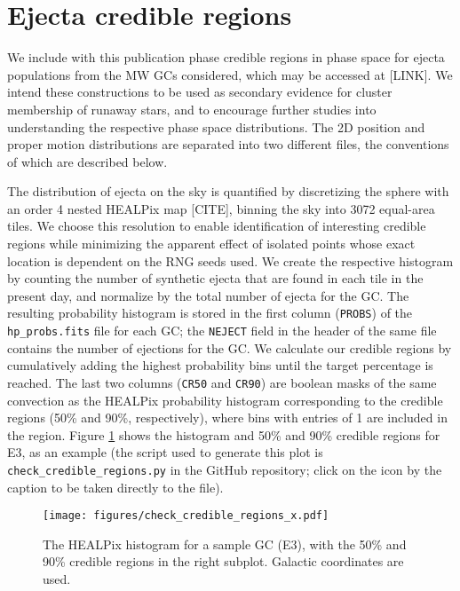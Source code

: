 \documentclass[twocolumn]{aastex631}
\begin{document}
\appendix

\section{Ejecta credible regions} \label{app:credreg}

We include with this publication phase credible regions in phase space for ejecta populations from the MW GCs considered, which may be accessed at [LINK].
We intend these constructions to be used as secondary evidence for cluster membership of runaway stars, and to encourage further studies into understanding the respective phase space distributions.
The 2D position and proper motion distributions are separated into two different files, the conventions of which are described below.

The distribution of ejecta on the sky is quantified by discretizing the sphere with an order 4 nested HEALPix map [CITE], binning the sky into 3072 equal-area tiles.
We choose this resolution to enable identification of interesting credible regions while minimizing the apparent effect of isolated points whose exact location is dependent on the RNG seeds used.
We create the respective histogram by counting the number of synthetic ejecta that are found in each tile in the present day, and normalize by the total number of ejecta for the GC.
The resulting probability histogram is stored in the first column (\texttt{PROBS}) of the \texttt{hp\_probs.fits} file for each GC; the \texttt{NEJECT} field in the header of the same file contains the number of ejections for the GC.
We calculate our credible regions by cumulatively adding the highest probability bins until the target percentage is reached.
The last two columns (\texttt{CR50} and \texttt{CR90}) are boolean masks of the same convection as the HEALPix probability histogram corresponding to the credible regions (50\% and 90\%, respectively), where bins with entries of 1 are included in the region.
Figure \ref{fig:check_credible_regions_x} shows the histogram and 50\% and 90\% credible regions for E3, as an example (the script used to generate this plot is \texttt{check\_credible\_regions.py} in the GitHub repository; click on the icon by the caption to be taken directly to the file).

\begin{figure}
    \centering
    \texttt{[image: figures/check\_credible\_regions\_x.pdf]}
    \caption{
        The HEALPix histogram for a sample GC (E3), with the 50\% and 90\% credible regions in the right subplot.
        Galactic coordinates are used.
    }
    \label{fig:check_credible_regions_x}
\end{figure}
\end{document}
